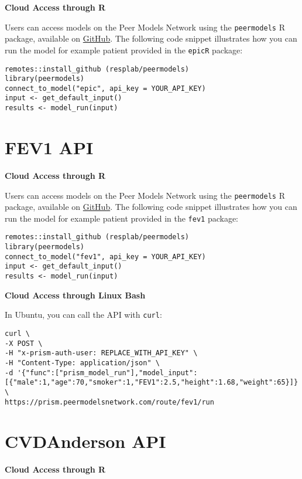 \documentclass[
]{book}
\begin{document}
\textbf{Cloud Access through R}

Users can access models on the Peer Models Network using the \texttt{peermodels} R package, available on \href{https://github.com/resplab/peermodels}{GitHub}. The following code snippet illustrates how you can run the model for example patient provided in the \texttt{epicR} package:

\begin{verbatim}
remotes::install_github (resplab/peermodels)
library(peermodels)
connect_to_model("epic", api_key = YOUR_API_KEY)
input <- get_default_input()
results <- model_run(input)
\end{verbatim}

\hypertarget{fev1-api}{%
\section{FEV1 API}\label{fev1-api}}

\textbf{Cloud Access through R}

Users can access models on the Peer Models Network using the \texttt{peermodels} R package, available on \href{https://github.com/resplab/peermodels}{GitHub}. The following code snippet illustrates how you can run the model for example patient provided in the \texttt{fev1} package:

\begin{verbatim}
remotes::install_github (resplab/peermodels)
library(peermodels)
connect_to_model("fev1", api_key = YOUR_API_KEY)
input <- get_default_input()
results <- model_run(input)
\end{verbatim}

\textbf{Cloud Access through Linux Bash}

In Ubuntu, you can call the API with \texttt{curl}:

\begin{verbatim}
curl \
-X POST \
-H "x-prism-auth-user: REPLACE_WITH_API_KEY" \
-H "Content-Type: application/json" \
-d '{"func":["prism_model_run"],"model_input":[{"male":1,"age":70,"smoker":1,"FEV1":2.5,"height":1.68,"weight":65}]}' \
https://prism.peermodelsnetwork.com/route/fev1/run
\end{verbatim}

\hypertarget{cvdanderson-api}{%
\section{CVDAnderson API}\label{cvdanderson-api}}

\textbf{Cloud Access through R}
\end{document}

